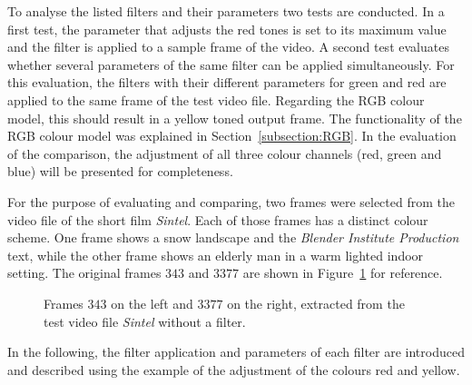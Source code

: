 \documentclass[../MasterThesis.tex]{subfiles}
\begin{document}
To analyse the listed filters and their parameters two tests are conducted. In a first test, the parameter that adjusts the red tones is set to its maximum value and the filter is applied to a sample frame of the video.
A second test evaluates whether several parameters of the same filter can be applied simultaneously.
%
For this evaluation, the filters with their different parameters for green and red are applied to the same frame of the test video file. Regarding the RGB colour model, this should result in a yellow toned output frame. The functionality of the RGB colour model was explained in Section~\ref{subsection:RGB}. 
%
In the evaluation of the comparison, the adjustment of all three colour channels (red, green and blue) will be presented for completeness.

For the purpose of evaluating and comparing, two frames were selected from the video file of the short film \textit{Sintel}. Each of those frames has a distinct colour scheme. One frame shows a snow landscape and the \textit{Blender Institute Production} text, while the other frame shows an elderly man in a warm lighted indoor setting. The original frames $343$ and $3377$ are shown in Figure~\ref{figure:nofilter} for reference.


\begin{figure}[H]
	\begin{center}
		\caption[Frames $343$ and $3377$ from the test video file without a filter.]{Frames $343$ on the left and $3377$ on the right, extracted from the test video file \textit{Sintel} without a filter.}
		\label{figure:nofilter}
	\end{center}
\end{figure}





In the following, the filter application and parameters of each filter are introduced and described using the example of the adjustment of the colours red and yellow.
\end{document}
